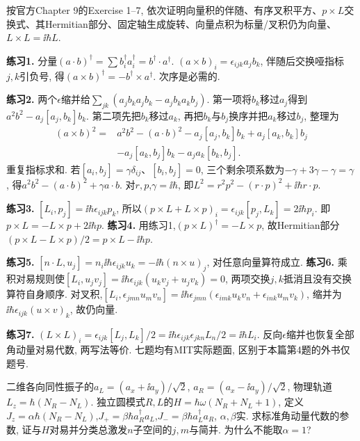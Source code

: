 \begin{exercise}
按官方Chapter 9的Exercise 1--7, 依次证明向量积的伴随、有序叉积平方、$p\times L$交换式、其Hermitian部分、固定轴生成旋转、向量点积为标量/叉积仍为向量、$L\times L=\ii\hbar L$.
\end{exercise}
\begin{solution}
\textbf{练习1.} 分量$(a\cdot b)^\dagger=\sum b_i^\dagger a_i^\dagger=b^\dagger\cdot a^\dagger$. $(a\times b)_i=\epsilon_{ijk}a_jb_k$, 伴随后交换哑指标$j,k$引负号, 得$(a\times b)^\dagger=-b^\dagger\times a^\dagger$. 次序是必需的.

\textbf{练习2.} 两个$\epsilon$缩并给$\sum_{jk}(a_jb_ka_jb_k-a_jb_ka_kb_j)$. 第一项将$b_k$移过$a_j$得到$a^2b^2-a_j[a_j,b_k]b_k$. 第二项先把$b_k$移过$a_k$, 再把$b_k$与$b_j$换序并把$a_k$移过$b_j$, 整理为
\begin{align*}
(a\times b)^2={}&a^2b^2-(a\cdot b)^2-a_j[a_j,b_k]b_k
+a_j[a_k,b_k]b_j\\
&-a_j[a_k,b_j]b_k-a_ja_k[b_k,b_j].
\end{align*}
重复指标求和. 若$[a_i,b_j]=\gamma\delta_{ij}$、$[b_i,b_j]=0$, 三个剩余项系数为$-\gamma+3\gamma-\gamma=\gamma$, 得$a^2b^2-(a\cdot b)^2+\gamma a\cdot b$. 对$r,p$,$\gamma=\ii\hbar$, 即$L^2=r^2p^2-(r\cdot p)^2+\ii\hbar r\cdot p$.

\textbf{练习3.} $[L_i,p_j]=\ii\hbar\epsilon_{ijk}p_k$, 所以$(p\times L+L\times p)_i=\epsilon_{ijk}[p_j,L_k]=2\ii\hbar p_i$. 即$p\times L=-L\times p+2\ii\hbar p$. \textbf{练习4.} 用练习1,$(p\times L)^\dagger=-L\times p$, 故Hermitian部分$(p\times L-L\times p)/2=p\times L-\ii\hbar p$.

\textbf{练习5.} $[n\cdot L,u_j]=n_i\ii\hbar\epsilon_{ijk}u_k=-\ii\hbar(n\times u)_j$, 对任意向量算符成立. \textbf{练习6.} 乘积对易规则使$[L_i,u_jv_j]=\ii\hbar\epsilon_{ijk}(u_kv_j+u_jv_k)=0$, 两项交换$j,k$抵消且没有交换算符自身顺序. 对叉积,$[L_i,\epsilon_{jmn}u_mv_n]=\ii\hbar\epsilon_{jmn}(\epsilon_{imk}u_kv_n+\epsilon_{ink}u_mv_k)$, 缩并为$\ii\hbar\epsilon_{ijk}(u\times v)_k$, 故仍向量.

\textbf{练习7.} $(L\times L)_i=\epsilon_{ijk}[L_j,L_k]/2=\ii\hbar\epsilon_{ijk}\epsilon_{jkn}L_n/2=\ii\hbar L_i$. 反向$\epsilon$缩并也恢复全部角动量对易代数, 两写法等价. 七题均有MIT实际题面, 区别于本篇第4题的外书仅题号.
\end{solution}
\begin{exercise}
二维各向同性振子的$a_L=(a_x+\ii a_y)/\sqrt2$, $a_R=(a_x-\ii a_y)/\sqrt2$, 物理轨道$L_z=\hbar(N_R-N_L)$. 独立圆模式$R,L$的$H=\hbar\omega(N_R+N_L+1)$, 定义$J_z=\alpha\hbar(N_R-N_L)$,$J_+=\beta\hbar a_R^\dagger a_L$,$J_-=\beta\hbar a_L^\dagger a_R$, $\alpha,\beta$实. 求标准角动量代数的参数, 证与$H$对易并分类总激发$n$子空间的$j,m$与简并. 为什么不能取$\alpha=1$?
\end{exercise}
